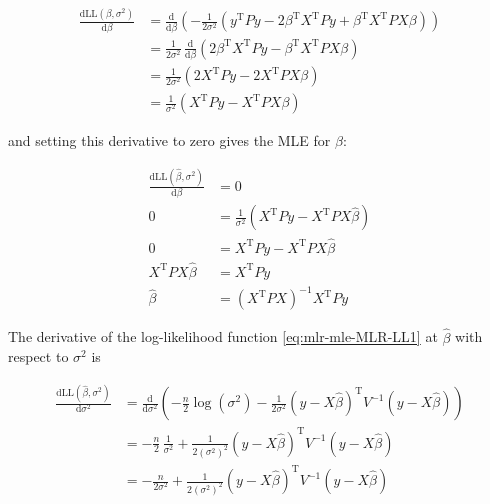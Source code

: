 \documentclass[a4paper,12pt,twoside]{book}
\begin{document}
\begin{equation} \label{eq:mlr-mle-dLL-dbeta}
\begin{split}
\frac{\mathrm{d}\mathrm{LL}(\beta,\sigma^2)}{\mathrm{d}\beta} &= \frac{\mathrm{d}}{\mathrm{d}\beta} \left( - \frac{1}{2 \sigma^2} \left( y^\mathrm{T} P y - 2 \beta^\mathrm{T} X^\mathrm{T} P y + \beta^\mathrm{T} X^\mathrm{T} P X \beta \right) \right) \\
&= \frac{1}{2 \sigma^2} \, \frac{\mathrm{d}}{\mathrm{d}\beta} \left( 2 \beta^\mathrm{T} X^\mathrm{T} P y - \beta^\mathrm{T} X^\mathrm{T} P X \beta \right) \\
&= \frac{1}{2 \sigma^2} \left( 2 X^\mathrm{T} P y - 2 X^\mathrm{T} P X \beta \right) \\
&= \frac{1}{\sigma^2} \left( X^\mathrm{T} P y - X^\mathrm{T} P X \beta \right)
\end{split}
\end{equation}

and setting this derivative to zero gives the MLE for $\beta$:

\begin{equation} \label{eq:mlr-mle-beta-MLE}
\begin{split}
\frac{\mathrm{d}\mathrm{LL}(\hat{\beta},\sigma^2)}{\mathrm{d}\beta} &= 0 \\
0 &= \frac{1}{\sigma^2} \left( X^\mathrm{T} P y - X^\mathrm{T} P X \hat{\beta} \right) \\
0 &= X^\mathrm{T} P y - X^\mathrm{T} P X \hat{\beta} \\
X^\mathrm{T} P X \hat{\beta} &= X^\mathrm{T} P y \\
\hat{\beta} &= \left( X^\mathrm{T} P X \right)^{-1} X^\mathrm{T} P y
\end{split}
\end{equation}

\vspace{1em}
The derivative of the log-likelihood function \eqref{eq:mlr-mle-MLR-LL1} at $\hat{\beta}$ with respect to $\sigma^2$ is

\begin{equation} \label{eq:mlr-mle-dLL-ds2}
\begin{split}
\frac{\mathrm{d}\mathrm{LL}(\hat{\beta},\sigma^2)}{\mathrm{d}\sigma^2} &= \frac{\mathrm{d}}{\mathrm{d}\sigma^2} \left( - \frac{n}{2} \log (\sigma^2) - \frac{1}{2 \sigma^2} (y - X\hat{\beta})^\mathrm{T} V^{-1} (y - X\hat{\beta}) \right) \\
&= - \frac{n}{2} \, \frac{1}{\sigma^2} + \frac{1}{2 (\sigma^2)^2} (y - X\hat{\beta})^\mathrm{T} V^{-1} (y - X\hat{\beta}) \\
&= - \frac{n}{2 \sigma^2} + \frac{1}{2 (\sigma^2)^2} (y - X\hat{\beta})^\mathrm{T} V^{-1} (y - X\hat{\beta})
\end{split}
\end{equation}
\end{document}
